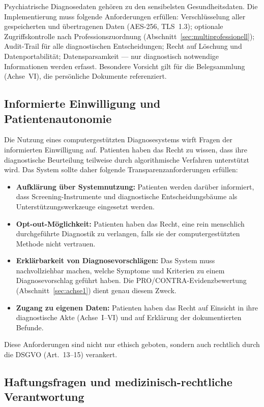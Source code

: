 \documentclass[11pt,a4paper]{article}
\begin{document}
Psychiatrische Diagnosedaten geh\"oren zu den sensibelsten Gesundheitsdaten. Die Implementierung muss folgende Anforderungen erf\"ullen: Verschl\"usselung aller gespeicherten und \"ubertragenen Daten (AES-256, TLS~1.3); optionale Zugriffskontrolle nach Professionszuordnung (Abschnitt~\ref{sec:multiprofessionell}); Audit-Trail f\"ur alle diagnostischen Entscheidungen; Recht auf L\"oschung und Datenportabilit\"at; Datensparsamkeit --- nur diagnostisch notwendige Informationen werden erfasst. Besondere Vorsicht gilt f\"ur die Belegsammlung (Achse~VI), die pers\"onliche Dokumente referenziert.

\subsection{Informierte Einwilligung und Patientenautonomie}

Die Nutzung eines computergest\"utzten Diagnosesystems wirft Fragen der informierten Einwilligung auf. Patienten haben das Recht zu wissen, dass ihre diagnostische Beurteilung teilweise durch algorithmische Verfahren unterst\"utzt wird. Das System sollte daher folgende Transparenzanforderungen erf\"ullen:

\begin{itemize}[noitemsep]
\item \textbf{Aufkl\"arung \"uber Systemnutzung:} Patienten werden dar\"uber informiert, dass Screening-Instrumente und diagnostische Entscheidungsb\"aume als Unterst\"utzungswerkzeuge eingesetzt werden.
\item \textbf{Opt-out-M\"oglichkeit:} Patienten haben das Recht, eine rein menschlich durchgef\"uhrte Diagnostik zu verlangen, falls sie der computergest\"utzten Methode nicht vertrauen.
\item \textbf{Erkl\"arbarkeit von Diagnosevorschl\"agen:} Das System muss nachvollziehbar machen, welche Symptome und Kriterien zu einem Diagnosevorschlag gef\"uhrt haben. Die PRO/CONTRA-Evidenzbewertung (Abschnitt~\ref{sec:achse1}) dient genau diesem Zweck.
\item \textbf{Zugang zu eigenen Daten:} Patienten haben das Recht auf Einsicht in ihre diagnostische Akte (Achse~I--VI) und auf Erkl\"arung der dokumentierten Befunde.
\end{itemize}

Diese Anforderungen sind nicht nur ethisch geboten, sondern auch rechtlich durch die DSGVO (Art.~13--15) verankert.

\subsection{Haftungsfragen und medizinisch-rechtliche Verantwortung}
\end{document}
